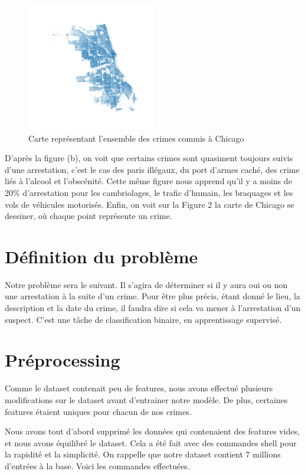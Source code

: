 \documentclass{article}
\begin{document}
    \begin{figure}
	    \centering
	    \includegraphics[width=0.5\textwidth]{images/carte_chicago.png}
	    \caption{Carte représentant l'ensemble des crimes commis à Chicago}
    \end{figure}

    D'après la figure (b), on voit que certains crimes sont quasiment toujours suivis 
    d'une arrestation, c'est le cas des paris illégaux, du port d'armes caché, 
    des crime liés à l'alcool et l'obscénité.
    Cette même figure nous apprend qu'il y a moins de 20\% d'arrestation pour les 
    cambriolages, le trafic d'humain, les braquages et les vols de véhicules motorisés.
    Enfin, on voit sur la Figure 2 la carte de Chicago se dessiner, où chaque
    point représente un crime.


    \section{Définition du problème}
    Notre problème sera le suivant. Il s'agira de déterminer si il y aura
    oui ou non une arrestation à la suite d'un crime. 
    Pour être plus précis, étant donné le lieu, la description et la date du crime, 
    il faudra dire si cela va mener à l'arrestation d'un suspect.
    C'est une tâche de classification
    binaire, en apprentissage supervisé.

    \section{Préprocessing}
    Comme le dataset contenait peu de features, 
    nous avons effectué plusieurs modifications sur le dataset 
    avant d'entrainer notre modèle.
    De plus, certaines features étaient uniques pour chacun de nos crimes.

    Nous avons tout d'abord supprimé les données qui contenaient des features vides,
    et nous avons
    équilibré le dataset.
    Cela a été fait avec des commandes shell pour la rapidité et la simplicité. 
    On rappelle que notre dataset contient 7 millions d'entrées à la base.
    Voici les commandes effectuées.
\end{document}
